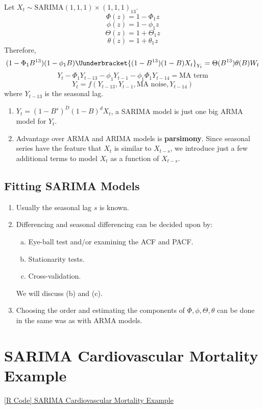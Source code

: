\begin{Example}{}{}
    Let $ X_t \sim \text{SARIMA}(1,1,1)\times(1,1,1)_{13} $.
    \[ \Phi(z)=1-\Phi_1 z \]
    \[ \phi(z)=1-\phi_1 z \]
    \[ \Theta(z)=1+\Theta_1 z \]
    \[ \theta(z)=1+\theta_1 z \]
    Therefore,
    \[ (1-\Phi_1 B^{13})(1-\phi_1 B)\Uunderbracket{(1-B^{13})(1-B)X_t}_{Y_t}=\Theta(B^{13})\theta(B)W_t \]
    \[ Y_t-\Phi_1 Y_{t-13}-\phi_1 Y_{t-1}-\phi_1 \Phi_1 Y_{t-14}=\text{MA term} \]
    \[ Y_t=f(Y_{t-13},Y_{t-1},\text{MA noise}, Y_{t-14}) \]
    where $ Y_{t-13} $ is the seasonal lag.
\end{Example}
\begin{Remark}{}{}
    \begin{enumerate}[(1)]
        \item $ Y_t=(1-B^s)^D(1-B)^d X_t $, a SARIMA model is just one big ARMA
              model for $ Y_t $.
        \item Advantage over ARMA and ARIMA models is \textbf{parsimony}.
              Since seasonal series have the feature that $ X_t $ is similar to $ X_{t-s} $,
              we introduce just a few additional terms to model $ X_t $ as a function of
              $ X_{t-s} $.
    \end{enumerate}
\end{Remark}
\subsection*{Fitting SARIMA Models}
\begin{enumerate}[(1)]
    \item Usually the seasonal lag $ s $ is known.
    \item Differencing and seasonal differencing can be decided upon by:
          \begin{enumerate}[(a)]
              \item Eye-ball test and/or examining the ACF and PACF\@.
              \item Stationarity tests.
              \item Cross-validation.
          \end{enumerate}
          {\color{blue}We will discuss (b) and (c).}
    \item Choosing the order and estimating the components of $ \Phi,\phi,\Theta,\theta $
          can be done in the same was as with ARMA models.
\end{enumerate}
\section{SARIMA Cardiovascular Mortality Example}
\href{https://github.com/Hextical/university-notes/blob/master/year-3/semester-2/STAT 443/code/6.2 - SARIMA Cmort Example.R}{[R Code] SARIMA Cardiovascular Mortality Example}
